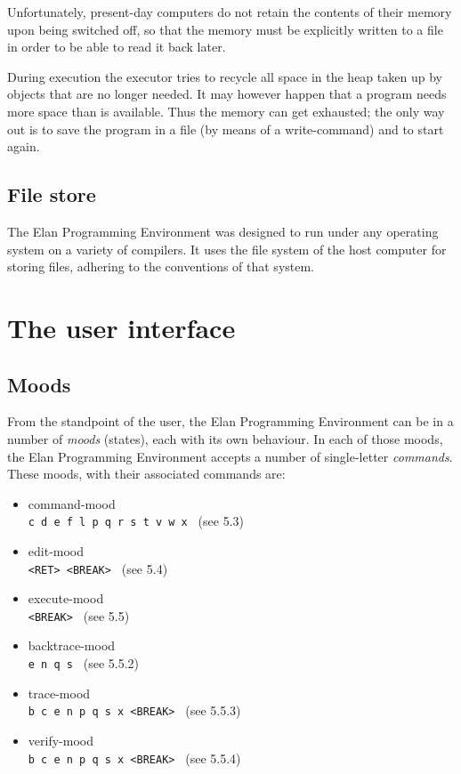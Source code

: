 \noindent
Unfortunately, present-day computers do not retain the contents
of their memory upon being switched off, so that the memory must
be explicitly written to a file in order to be able to read it
back later.

During execution the executor tries to recycle all space in the
heap taken up by objects that are no longer needed. It may however
happen that a program needs more space than is available. Thus
the memory can get exhausted; the only way out is to save the
program in a file (by means of a write-command) and to start
again.

\subsection{File store}

The Elan Programming Environment was designed to run under
any operating system on a variety of compilers. It uses the file
system of the host computer for storing files, adhering to the
conventions of that system.

\section{The user interface}

\subsection{Moods}

From the standpoint of the user, the Elan Programming Environment
can be in a number of {\em moods} (states), each with its own
behaviour. In each of those moods, the Elan Programming Environment
accepts a number of single-letter {\em commands}. These moods,
with their associated commands are:

\begin{itemize}
\item command-mood\\    {\tt c d e f l p q r s t v w x } (see 5.3)
\item edit-mood\\       {\tt <RET> <BREAK> } (see 5.4)
\item execute-mood\\    {\tt <BREAK> } (see 5.5)
\item backtrace-mood\\  {\tt e n q s } (see 5.5.2)
\item trace-mood\\      {\tt b c e n p q s x <BREAK> } (see 5.5.3)
\item verify-mood\\     {\tt b c e n p q s x <BREAK>   } (see 5.5.4)
\end{itemize}

